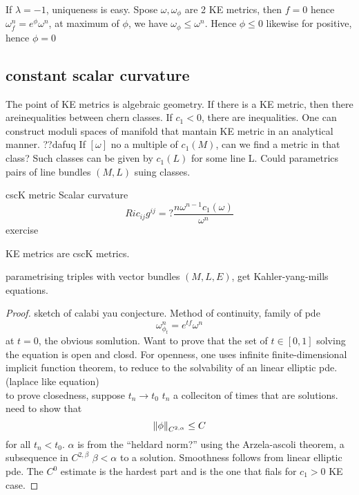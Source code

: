 If $\lambda = -1$, uniqueness is easy.
Spose $\omega, \omega_\phi$ are 2 KE metrics, then $f =0$ hence
$\omega_f^n = e^\phi \omega^n$, at maximum of $\phi$, we have $\omega_\phi \leq \omega^n$. Hence $\phi \leq 0$ likewise for positive, hence $\phi = 0$
\subsection{constant scalar curvature} %
\label{sub:constant_scalar_curvature}
The point of KE metrics is algebraic geometry.
If there is a KE metric, then there areinequalities between chern classes.
If $c_1<0$, there are inequalities.
One can construct moduli spaces of manifold that mantain KE metric in an analytical manner. ??dafuq
If $[\omega]$ no a multiple of $c_1(M)$, can we find a metric in that class?
Such classes can be given by $c_1(L)$ for some line L.
Could parametrics pairs of line bundles $(M,L)$ suing classes.

cscK metric
Scalar curvature
\begin{equation}
    Ric_{ij} g^{ij} =? \frac{n \omega^{n-1}c_1(\omega)}{\omega^n}
\end{equation}
exercise

KE metrics are cscK metrics.

parametrising triples with vector bundles $(M,L,E)$, get Kahler-yang-mills equations.

\begin{proof}
    sketch of calabi yau conjecture.
    Method of continuity, family of pde
    \begin{equation}
        \omega^n_{\phi_t} = e^{tf}\omega^n
    \end{equation}
    at $t=0$, the obvious somlution.
    Want to prove that the set of $t \in [0,1]$ solving the equation is open and closd.
    For openness, one uses infinite finite-dimensional implicit function theorem, to reduce to the solvability of an linear elliptic pde. (laplace like equation)\\
    to prove closedness, suppose $t_n \rightarrow t_0$ $t_n$ a colleciton of times that are solutions.
    need to show that 
    \begin{equation}
        \left\lVert \phi\right\rVert_{C^{2,\alpha}} \leq C
    \end{equation}
    for all $t_n< t_0$. $\alpha$ is from the ``heldard norm?''
    using the Arzela-ascoli theorem, a subsequence in $C^{2,\beta}$ $\beta < \alpha$ to a solution. Smoothness follows from linear elliptic pde.
    The $C^0$ estimate is the hardest part and is the one that fials for $c_1 >0$ KE case.
\end{proof}


